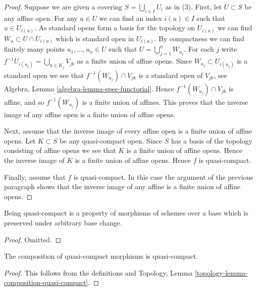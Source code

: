 \begin{proof}
Suppose we are given a covering $S = \bigcup_{i \in I} U_i$ as in (3).
First, let $U \subset S$ be any affine open. For any $u \in U$
we can find an index $i(u) \in I$ such that $u \in U_{i(u)}$.
As standard opens form a basis for the topology on $U_{i(u)}$ we can find
$W_u \subset U \cap U_{i(u)}$ which is standard open in $U_{i(u)}$.
By compactness we can find finitely many points $u_1, \ldots, u_n \in U$
such that $U = \bigcup_{j = 1}^n W_{u_j}$. For each $j$ write
$f^{-1}U_{i(u_j)} = \bigcup_{k \in K_j} V_{jk}$ as a finite
union of affine opens. Since $W_{u_j} \subset U_{i(u_j)}$ is a standard
open we see that $f^{-1}(W_{u_j}) \cap V_{jk}$ is a standard
open of $V_{jk}$, see Algebra, Lemma \ref{algebra-lemma-spec-functorial}.
Hence $f^{-1}(W_{u_j}) \cap V_{jk}$ is affine, and so
$f^{-1}(W_{u_j})$ is a finite union of affines. This proves that the
inverse image of any affine open is a finite union of affine opens.

\medskip\noindent
Next, assume that the inverse image of every affine open is a finite
union of affine opens.
Let $K \subset S$ be any quasi-compact open. Since $S$ has a basis
of the topology consisting of affine opens we see that $K$ is a finite
union of affine opens. Hence the inverse image of $K$ is a finite
union of affine opens. Hence $f$ is quasi-compact.

\medskip\noindent
Finally, assume that $f$ is quasi-compact. In this case the argument
of the previous paragraph shows that the inverse image of any affine
is a finite union of affine opens.
\end{proof}

\begin{lemma}
\label{lemma-quasi-compact-preserved-base-change}
Being quasi-compact is a property of morphisms of schemes
over a base which is preserved under arbitrary base change.
\end{lemma}

\begin{proof}
Omitted.
\end{proof}

\begin{lemma}
\label{lemma-composition-quasi-compact}
The composition of quasi-compact morphisms is quasi-compact.
\end{lemma}

\begin{proof}
This follows from the definitions and
Topology, Lemma \ref{topology-lemma-composition-quasi-compact}.
\end{proof}

